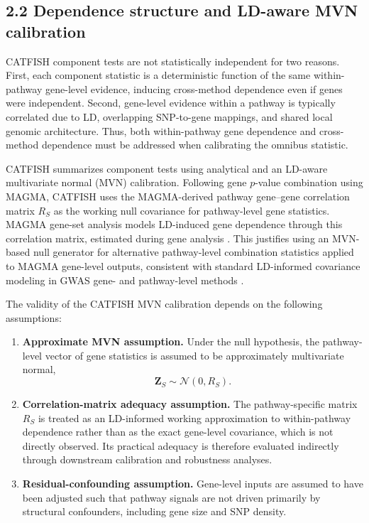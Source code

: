 \documentclass[unnumsec,webpdf,contemporary,large]{oup-authoring-template}%
\theoremstyle{thmstyleone}%
\theoremstyle{thmstyletwo}%
\theoremstyle{thmstylethree}%
\begin{document}
\subsection{2.2 Dependence structure and LD-aware MVN calibration}

CATFISH component tests are not statistically independent for two reasons. First, each component statistic is a deterministic function of the same within-pathway gene-level evidence, inducing cross-method dependence even if genes were independent. Second, gene-level evidence within a pathway is typically correlated due to LD, overlapping SNP-to-gene mappings, and shared local genomic architecture. Thus, both within-pathway gene dependence and cross-method dependence must be addressed when calibrating the omnibus statistic.

CATFISH summarizes component tests using analytical and an LD-aware multivariate normal (MVN) calibration. Following gene $p$-value combination using MAGMA, CATFISH uses the MAGMA-derived pathway gene–gene correlation matrix $R_S$ as the working null covariance for pathway-level gene statistics. MAGMA gene-set analysis models LD-induced gene dependence through this correlation matrix, estimated during gene analysis \citep{deLeeuw2015MAGMA}. This justifies using an MVN-based null generator for alternative pathway-level combination statistics applied to MAGMA gene-level outputs, consistent with standard LD-informed covariance modeling in GWAS gene- and pathway-level methods \citep{deLeeuw2015MAGMA}.

The validity of the CATFISH MVN calibration depends on the following assumptions:

\begin{enumerate}
    \item \textbf{Approximate MVN assumption.} Under the null hypothesis, the pathway-level vector of gene statistics is assumed to be approximately multivariate normal,
    \[
    \mathbf{Z}_S \sim \mathcal{N}(0,R_S).
    \]

    \item \textbf{Correlation-matrix adequacy assumption.} The pathway-specific matrix $R_S$ is treated as an LD-informed working approximation to within-pathway dependence rather than as the exact gene-level covariance, which is not directly observed. Its practical adequacy is therefore evaluated indirectly through downstream calibration and robustness analyses.

    \item \textbf{Residual-confounding assumption.} Gene-level inputs are assumed to have been adjusted such that pathway signals are not driven primarily by structural confounders, including gene size and SNP density.
\end{enumerate}
\end{document}
